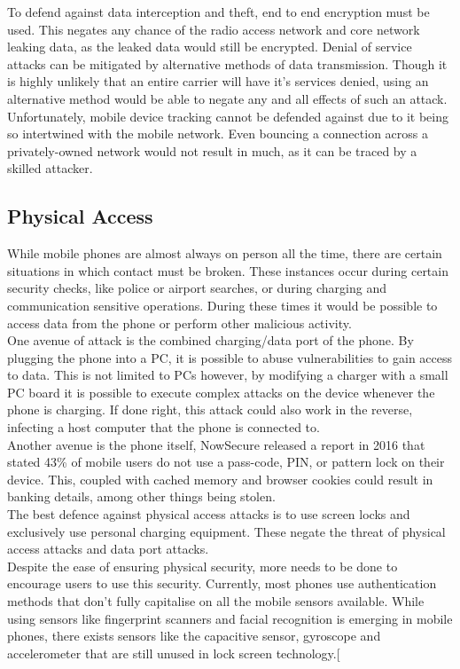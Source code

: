 To defend against data interception and theft, end to end encryption must be used. This negates any chance of the radio access network and core network leaking data, as the leaked data would still be encrypted. Denial of service attacks can be mitigated by alternative methods of data transmission. Though it is highly unlikely that an entire carrier will have it’s services denied, using an alternative method would be able to negate any and all effects of such an attack. Unfortunately, mobile device tracking cannot be defended against due to it being so intertwined with the mobile network. Even bouncing a connection across a privately-owned network would not result in much, as it can be traced by a skilled attacker.\cite{Reference13}


\subsection{Physical Access}

\label{Ch2 Sec2 Sub4}

While mobile phones are almost always on person all the time, there are certain situations in which contact must be broken. These instances occur during certain security checks, like police or airport searches, or during charging and communication sensitive operations. During these times it would be possible to access data from the phone or perform other malicious activity.\\
One avenue of attack is the combined charging/data port of the phone. By plugging the phone into a PC, it is possible to abuse vulnerabilities to gain access to data. This is not limited to PCs however, by modifying a charger with a small PC board it is possible to execute complex attacks on the device whenever the phone is charging. If done right, this attack could also work in the reverse, infecting a host computer that the phone is connected to.\cite{Reference13}\\  Another avenue is the phone itself, NowSecure released a report in 2016 that stated 43\% of mobile users do not use a pass-code, PIN, or pattern lock on their device.\cite{Reference18} This, coupled with cached memory and browser cookies could result in banking details, among other things being stolen.\\
The best defence against physical access attacks is to use screen locks and exclusively use personal charging equipment. These negate the threat of physical access attacks and data port attacks.\\
Despite the ease of ensuring physical security, more needs to be done to encourage users to use this security. Currently, most phones use authentication methods that don’t fully capitalise on all the mobile sensors available. While using sensors like fingerprint scanners and facial recognition is emerging in mobile phones, there exists sensors like the capacitive sensor, gyroscope and accelerometer that are still unused in lock screen technology.[\cite{Reference13}

